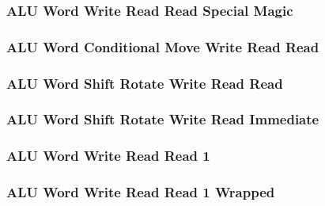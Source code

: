

\subsubsection[{\small ALU Word Write Read Read Special Magic}]{ALU Word Write Read Read Special Magic} \label{sec:format-ALU-WWRRS.M}



\subsubsection[{\small ALU Word Conditional Move Write Read Read}]{ALU Word Conditional Move Write Read Read} \label{sec:format-ALU-WCMWRR}



\subsubsection[{\small ALU Word Shift Rotate Write Read Read}]{ALU Word Shift Rotate Write Read Read} \label{sec:format-ALU-WSWRR}



\subsubsection[{\small ALU Word Shift Rotate Write Read Immediate}]{ALU Word Shift Rotate Write Read Immediate} \label{sec:format-ALU-WSWRI}



\subsubsection[{\small ALU Word Write Read Read 1}]{ALU Word Write Read Read 1} \label{sec:format-ALU-WWRR1}



\subsubsection[{\small ALU Word Write Read Read 1 Wrapped}]{ALU Word Write Read Read 1 Wrapped} \label{sec:format-ALU-WWRR1.W}

